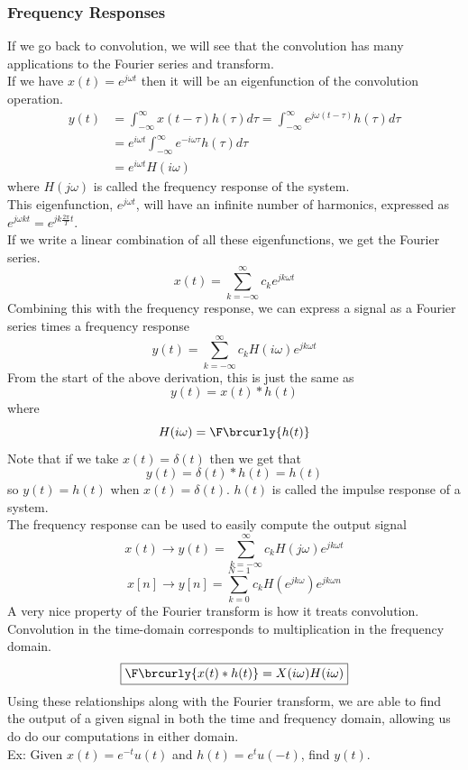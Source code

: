 \subsubsection{Frequency Responses}
If we go back to convolution, we will see that the convolution has many applications to the Fourier series and transform.\\
If we have $x(t)=e^{j\omega t}$ then it will be an eigenfunction of the convolution operation.
\begin{align*}
    y(t)&=\int_{-\infty}^\infty x(t-\tau)h(\tau)d\tau=\int_{-\infty}^\infty e^{j\omega(t-\tau)}h(\tau)d\tau\\
    &=e^{i\omega t}\int_{-\infty}^\infty e^{-i\omega \tau}h(\tau)d\tau\\
    &=e^{i\omega t}H(i\omega)
\end{align*}
where $H(j\omega)$ is called the frequency response of the system.\\
This eigenfunction, $e^{j\omega t}$, will have an infinite number of harmonics, expressed as $e^{j\omega kt}=e^{jk\frac{2\pi}{T}t}$.\\
If we write a linear combination of all these eigenfunctions, we get the Fourier series.
$$x(t)=\sum_{k=-\infty}^\infty c_ke^{jk\omega t}$$
Combining this with the frequency response, we can express a signal as a Fourier series times a frequency response
$$y(t)=\sum_{k=-\infty}^\infty c_kH(i\omega)e^{jk\omega t}$$
From the start of the above derivation, this is just the same as
$$y(t)=x(t)*h(t)$$
where
$$H(i\omega)=\F\brcurly{h(t)}$$
Note that if we take $x(t)=\delta(t)$ then we get that
$$y(t)=\delta(t)*h(t)=h(t)$$
so $y(t)=h(t)$ when $x(t)=\delta(t)$. $h(t)$ is called the impulse response of a system.\\
The frequency response can be used to easily compute the output signal
$$x(t)\to y(t)=\sum_{k=-\infty}^\infty c_kH(j\omega)e^{jk\omega t}$$
$$x[n]\to y[n]=\sum_{k=0}^{N-1}c_k H(e^{jk\omega})e^{jk\omega n}$$
A very nice property of the Fourier transform is how it treats convolution. Convolution in the time-domain corresponds to multiplication in the frequency domain.
$$\boxed{\F\brcurly{x(t)*h(t)}=X(i\omega)H(i\omega)}$$
Using these relationships along with the Fourier transform, we are able to find the output of a given signal in both the time and frequency domain, allowing us do do our computations in either domain.\\
Ex: Given $x(t)=e^{-t}u(t)$ and $h(t)=e^{t}u(-t)$, find $y(t)$.
